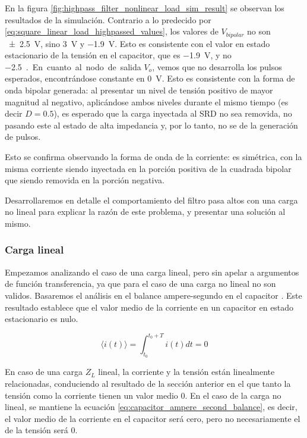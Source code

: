 En la figura \ref{fig:highpass_filter_nonlinear_load_sim_result} se observan los
resultados de la simulación. Contrario a lo predecido por
\ref{eq:square_linear_load_highpassed_values}, los valores de $V_{bipolar}$ no
son \qty{\pm2.5}{\volt}, sino \qty{3}{\volt} y \qty{-1.9}{\volt}. Esto es
consistente con el valor en estado estacionario de la tensión en el capacitor,
que es \qty{-1.9}{\volt}, y no \qty{-2.5}{\volt.}

En cuanto al nodo de salida $V_o$, vemos que no desarrolla los pulsos esperados,
encontrándose constante en \qty{0}{\volt}. Esto es consistente con la forma de
onda bipolar generada: al presentar un nivel de tensión positivo de mayor
magnitud al negativo, aplicándose ambos niveles durante el mismo tiempo (es
decir $D=0.5$), es esperado que la carga inyectada al SRD no sea removida, no
pasando este al estado de alta impedancia y, por lo tanto, no se de la
generación de pulsos.

Esto se confirma observando la forma de onda de la corriente: es simétrica, con
la misma corriente siendo inyectada en la porción positiva de la cuadrada
bipolar que siendo removida en la porción negativa.

Desarrollaremos en detalle el comportamiento del filtro pasa altos con una carga
no lineal para explicar la razón de este problema, y presentar una solución al
mismo.

\subsubsection{Carga lineal}

Empezamos analizando el caso de una carga lineal, pero sin apelar a argumentos
de función transferencia, ya que para el caso de una carga no lineal no son
validos. Basaremos el análisis en el balance ampere-segundo en el capacitor
\cite{Erickson_Robert_W_2020}. Este resultado establece que el valor medio de la
corriente en un capacitor en estado estacionario es nulo.

\begin{equation}
    \label{eq:capacitor_ampere_second_balance}
    \langle i(t) \rangle = \int_{t_0}^{t_0+T} i(t)dt = 0
\end{equation}

En caso de una carga $Z_L$ lineal, la corriente y la tensión están linealmente
relacionadas, conduciendo al resultado de la sección anterior en el que tanto la
tensión como la corriente tienen un valor medio 0. En el caso de la carga no
lineal, se mantiene la ecuación \ref{eq:capacitor_ampere_second_balance}, es
decir, el valor medio de la corriente en el capacitor será cero, pero no
necesariamente el de la tensión será 0.

